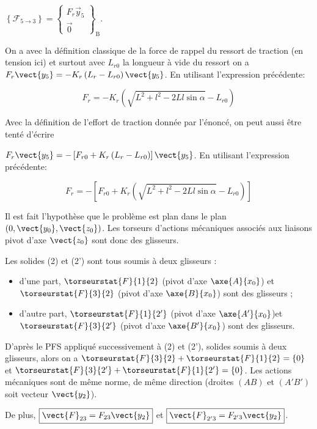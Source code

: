 $
\left\{\mathcal{F}_{5 \rightarrow 3}\right\}=\left\{\begin{array}{c}
F_{r} \vec{y}_{5} \\
\overrightarrow{0}
\end{array}\right\}_{\mathrm{B}} .
$
\fi

\ifprof
\begin{corrige}
On a avec la définition classique de la force de rappel du ressort de traction (en tension ici) et surtout avec $L_{r0}$ la longueur à vide du ressort on a $F_r\vect{y_5}=-K_r\left(L_r-L_{r0}\right)\vect{y_5}$. En utilisant l'expression précédente:
 
$$\boxed{F_r=-K_r\left(\sqrt{L^2+l^2-2Ll\sin\alpha}-L_{r0}\right)}$$

Avec la définition de l'effort de traction donnée par l'énoncé, on peut aussi être tenté d'écrire 

$F_r\vect{y_5}=-\left[ F_{r0} + K_r\left(L_r-L_{r0}\right)\right]\vect{y_5}$. En utilisant l'expression précédente:
 
$$\boxed{F_r=-\left[F_{r0} + K_r\left(\sqrt{L^2+l^2-2Ll\sin\alpha}-L_{r0}\right)\right]}$$
\end{corrige}
\else
\fi

\ifprof
\begin{corrige}
Il est fait l'hypothèse que le problème est plan dans le plan $\left(0,\vect{y_0},\vect{z_0}\right)$. Les torseurs d'actions mécaniques associés aux liaisons pivot d'axe $\vect{z_0}$ sont donc des glisseurs. 

Les solides (2) et (2') sont tous soumis à deux glisseurs :
\begin{itemize}
\item d'une part, $\torseurstat{F}{1}{2}$ (pivot d'axe $\axe{A}{x_0}$) et $\torseurstat{F}{3}{2}$ (pivot d'axe $\axe{B}{x_0}$) sont des glisseurs ;
\item d'autre part, $\torseurstat{F}{1}{2'}$ (pivot d'axe $\axe{A'}{x_0}$)et $\torseurstat{F}{3}{2'}$  (pivot d'axe $\axe{B'}{x_0}$) sont des glisseurs.
\end{itemize}

D'après le PFS appliqué successivement à (2) et (2'), solides soumis à deux glisseurs, alors on a 
 $\torseurstat{F}{3}{2}+\torseurstat{F}{1}{2}=\{0\}$ et
  $\torseurstat{F}{3}{2'}+\torseurstat{F}{1}{2'}=\{0\}$. Les actions mécaniques sont de même norme, de même direction (droites $(AB)$ et $(A'B')$ soit vecteur $\vect{y_2}$).
  
De plus, $\boxed{\vect{F}_{23}=F_{23}\vect{y_2}}$ et $\boxed{\vect{F}_{2'3}=F_{2'3}\vect{y_2}}$.
\end{corrige}
\else
\fi

